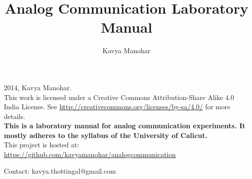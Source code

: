 \documentclass{book}
\begin{document}
\thispagestyle{empty}
\thispagestyle{empty}

\title{Analog Communication
Laboratory Manual}
\author{Kavya Manohar} {%
\maketitle
  
\noindent \textcopyright{}2014, Kavya Manohar.\\
\noindent
This work is licensed under a Creative Commons Attribution-Share Alike 4.0 India License. See \url{http://creativecommons.org/licenses/by-sa/4.0/} for more details.
\\[5cm]

\noindent \textbf{This is a laboratory manual for analog communication experiments. It mostly adheres to the syllabus of the  University of Calicut.}
\\

\noindent This project is hosted at:  \url{https://github.com/kavyamanohar/analogcommunication}


\noindent Contact: kavya.thottingal@gmail.com


\clearpage
\thispagestyle{plain}







\thispagestyle{empty}
\tableofcontents
\thispagestyle{empty}
\thispagestyle{empty}

\listoffigures
\thispagestyle{empty}




%
%






%
%
%

}
\end{document}
